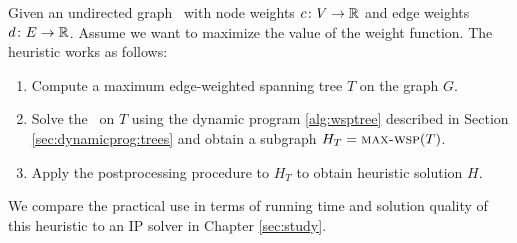 Given an undirected graph \ugraph\ with node weights $c\colon V \to \mathbb{R}$ and edge weights $d\colon E \to \mathbb{R}$. Assume we want to maximize the value of the weight function. The heuristic works as follows:

\begin{enumerate}
	\item Compute a maximum edge-weighted spanning tree $T$ on the graph $G$.
	\item Solve the \WSP\ on $T$ using the dynamic program \ref{alg:wsptree} described in Section \ref{sec:dynamicprog:trees} and obtain a subgraph $H_T = \text{\textsc{max-wsp}}(T)$.
	\item Apply the postprocessing procedure to $H_T$ to obtain heuristic solution $H$.
\end{enumerate}

We compare the practical use in terms of running time and solution quality of this heuristic to an IP solver in Chapter \ref{sec:study}.
